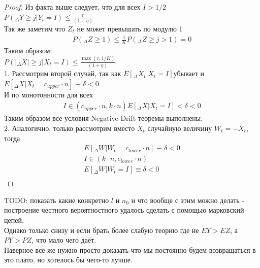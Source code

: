 \documentclass[times,specification,annotation]{itmo-student-thesis}
\newcommand{\Edelta}{$E[_{\Delta} X_t| X_t=I]$}
\begin{document}
    \begin{proof}
        Из факта выше следует, что для всех $I > 1/2$ \\
        $P(_{\Delta} Y \geq j|Y_t = I) \leq \frac{r}{(1 + \eta)}$ \\
        Так же заметим что $Z_t$ не может превышать по модулю 1 \\
        \begin{gather*}
            P(_{\Delta} Z \geq 1) \leq \frac{1}{K}
            P(_{\Delta} Z \geq j > 1)= 0
        \end{gather*}
        Таким образом: \\
        $P(|_{\Delta} X| \geq j|X_t = I) \leq \frac{\max(r, 1/K)}{(1 + \eta)}$ \\

        1. Рассмотрим второй случай, так как \Edelta убывает и $E[_{\Delta} X| X_t = c_{upper} \cdot n] \equiv \delta < 0$ \\
        И по монотонности для всех
        \begin{gather*}
            I \in (c_{upper} \cdot n, k \cdot n)
            E[_{\Delta} X| X_t = I] < \delta < 0
        \end{gather*}
        Таким образом все условия Negative-Drift теоремы выполнены. \\

        2. Аналогично, только рассмотрим вместо $X_t$ случайную величину $W_t = -X_t$, тогда \\
        \begin{gather*}
            E[_{\Delta} W| W_t = c_{lower} \cdot n] \equiv \delta < 0 \\
            I \in (k \cdot n, c_{lower} \cdot n)  \\
            E[_{\Delta} W| W_t = I] \equiv \delta < 0 \\
        \end{gather*}
    \end{proof}

    TODO: показать какие конкретно $l$ и $n_0$ и что вообще с этим можно делать - построение честного вероятностного удалось сделать с помощью марковский цепей.\\
    Однако только снизу и если брать более слабую теорию где не $EY > EZ$, а $PY > PZ$, что мало чего даёт. \\
    Наверное всё же нужно просто доказать что мы постоянно будем возвращаться в это плато, но хотелось бы чего-то лучше.
\end{document}

